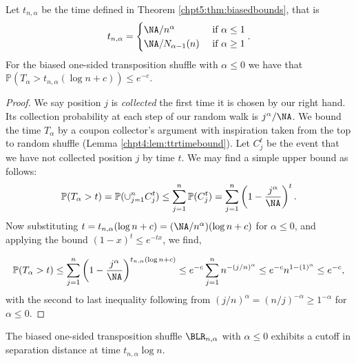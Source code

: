 \documentclass[11pt]{report}
\begin{document}
\begin{lemma}
	\label{chpt5:lem:SSTnegalpha}
	Let $t_{n,\alpha}$ be the time defined in Theorem \ref{chpt5:thm:biasedbounds}, that is
	\[t_{n,\alpha}= \begin{cases}
	\NA/n^{\alpha} & \textnormal{ if } \alpha \leq 1 \\
	\NA/N_{\alpha-1}(n) & \textnormal{ if } \alpha \geq 1 
	\end{cases}. \]
	For the biased one-sided transposition shuffle with $\alpha\leq0$ we have 
	that $\mathbb{P}(T_{\alpha} > t_{n,\alpha}(\log n + c)) \leq e^{-c}$.
\end{lemma}
\begin{proof}
	We say position $j$ is \emph{collected} the first time it is chosen by our right hand. Its collection probability at each step of our random walk is $j^{\alpha}/\NA$. We bound the time $T_{\alpha}$ by a coupon collector's argument with inspiration taken from the top to random shuffle (Lemma \ref{chpt4:lem:ttrtimebound}). Let $C_{j}^{t}$ be the event that we have not collected position $j$ by time $t$. We may find a simple upper bound as follows:
	\begin{eqnarray}
	\mathbb{P}(T_{\alpha} > t)  = \mathbb{P}(\cup_{j=1}^{n} C_{j}^{t}) \leq \sum_{j=1}^{n} \mathbb{P}(C_{j}^{t}) = \sum_{j=1}^{n}\left( 1 - \frac{j^{\alpha}}{\NA} \right)^{t}. \label{chpt5:eqn:biasedsep}
	\end{eqnarray}
	Now substituting $t = t_{n,\alpha}(\log n +c) = (\NA /n^{\alpha})(\log n +c)$ for $\alpha\leq 0$, and applying the bound $(1-x)^{t} \leq e^{-tx}$, we find,
	
	\begin{eqnarray*}
		\mathbb{P}(T_{\alpha} > t)  \leq  \sum_{j=1}^{n}\left( 1 - \frac{j^{\alpha}}{\NA} \right)^{ t_{n,\alpha}(\log n +c)} \leq e^{-c}\sum_{j=1}^{n} n^{-(j/n)^{\alpha}} \leq e^{-c} n^{1 -(1)^\alpha} \leq e^{-c},
	\end{eqnarray*} 
	with the second to last inequality following from $(j/n)^{\alpha}  = (n/j)^{-\alpha} \geq 1^{-\alpha}$ for $\alpha \leq 0$.
	
\end{proof}	




\begin{thm}
	\label{chpt5:thm:biasedsepcutoff}
	The biased one-sided transposition shuffle $\BLR_{n,\alpha}$ with $\alpha\leq 0$ exhibits a cutoff in separation distance at time $t_{n,\alpha} \log n$.	
\end{thm}
\end{document}
